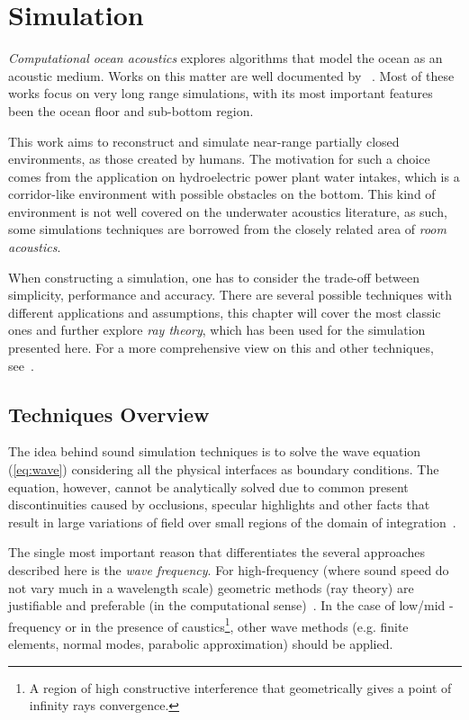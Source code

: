 \section{Simulation}

\textit{Computational ocean
acoustics} explores algorithms that model
the ocean as an acoustic medium. Works on this matter are well documented by
~\citet{Etter2013}. Most of these works focus on very long range simulations,
with its most important features been the ocean floor and sub-bottom region.

This work aims to reconstruct and simulate near-range partially closed
environments, as those created by humans. The motivation for such a choice comes
from the application on hydroelectric power plant water intakes, which is a
corridor-like environment with possible obstacles on the bottom. This kind of environment is not well
covered on the underwater acoustics literature, as such, some simulations
techniques are borrowed from the closely related area of \textit{room
acoustics}.

When constructing a simulation, one has to consider the trade-off between
simplicity, performance and accuracy. There are several possible techniques with
different applications and assumptions, this chapter will cover the most
classic ones and further explore \textit{ray theory}, which has been used for
the simulation presented here. For a more comprehensive view on this and other
techniques, see~\citet{LURTON,jensen2011computational}.

\subsection{Techniques Overview}
\label{ss:simuloverview}

The idea behind sound simulation techniques is to solve the wave
equation (\ref{eq:wave}) considering all the physical interfaces as
boundary conditions. The equation, however, cannot be analytically solved due to common
present discontinuities caused by occlusions, specular highlights and other
facts that result in large variations of field over small regions of the
domain of integration~\cite{funkhouser2003survey}.

The single most important reason that differentiates the several approaches
described here is the \textit{wave frequency}. For high-frequency (where sound
speed do not vary much in a wavelength scale) geometric methods (ray theory) are
justifiable and preferable (in the computational sense)~\cite{urick1979}. In the
case of low/mid - frequency or in the presence of caustics\footnote{A region of
high constructive interference that geometrically gives a point of infinity
rays convergence.}, other wave methods (e.g. finite elements, normal modes,
parabolic approximation) should be applied.

